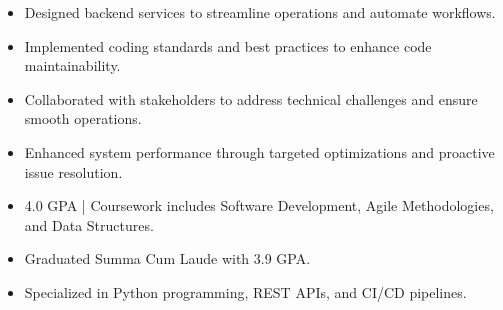\par\smallskip
\noindent
\begin{minipage}{20cm}
  \begin{minipage}{9.75cm}
    \begin{itemize}
      \item Designed backend services to streamline operations and automate workflows.
      \item Implemented coding standards and best practices to enhance code maintainability.
    \end{itemize}
  \end{minipage}
  \hfill
  \begin{minipage}{9.75cm}
    \begin{itemize}
      \item Collaborated with stakeholders to address technical challenges and ensure smooth operations.
      \item Enhanced system performance through targeted optimizations and proactive issue resolution.
    \end{itemize}
  \end{minipage}
\end{minipage}
\par\smallskip
\divider

\begin{itemize}
  \item 4.0 GPA | Coursework includes Software Development, Agile Methodologies, and Data Structures.
\end{itemize}
\divider

\begin{itemize}
  \item Graduated Summa Cum Laude with 3.9 GPA.
  \item Specialized in Python programming, REST APIs, and CI/CD pipelines.
\end{itemize}

\noindent
\begin{minipage}{20cm}
\end{minipage}


